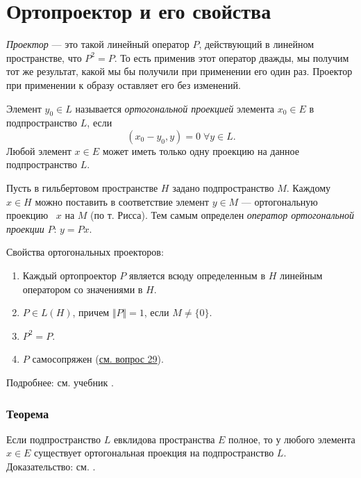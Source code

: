 \section{Ортопроектор и его свойства}
\label{sec:q-28}

\textit{Проектор} --- это такой линейный оператор $P$, действующий в линейном пространстве, что $P^2=P$. То есть применив этот оператор дважды, мы получим тот же результат, какой мы бы получили при применении его один раз. Проектор при применении к образу оставляет его без изменений.

Элемент $y_0 \in L$ называется \textit{ортогональной проекцией} элемента $x_0 \in E$ в подпространство $L$, если
$$(x_0-y_0,y)=0\;\forall y \in L.$$
Любой элемент $x \in E$ может иметь только одну проекцию на данное подпространство $L$.

Пусть в гильбертовом пространстве $H$ задано подпространство $M$. Каждому $x \in H$ можно поставить в соответствие элемент $y \in M$ --- ортогональную проекцию  $x$ на $M$ (по т. Рисса). Тем самым определен \textit{оператор ортогональной проекции} $P$: $y = Px$.

Свойства ортогональных проекторов:
\begin{enumerate}
	\itemsep0pt
	\item Каждый ортопроектор $P$ является всюду определенным в $H$ линейным оператором со значениями в $H$.
	\item $P \in L(H)$, причем $\Vert P \Vert = 1$, если $M \neq \{0\}$.
	\item $P^2 = P$.
	\item $P$ самосопряжен (\hyperref[sec:q-29]{см. вопрос 29}).
\end{enumerate}
Подробнее: см. учебник \cite[с.~187]{trenogin}.

\subsubsection*{Теорема}
Если подпространство $L$ евклидова пространства $E$ полное, то у любого элемента $x \in E$ существует ортогональная проекция на подпространство $L$.
Доказательство: см. \cite[с.~95]{mipt-lectures-1}.